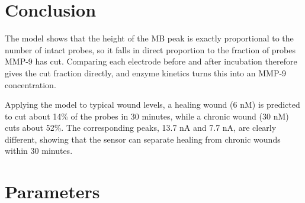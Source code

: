 \documentclass[10pt,a4paper]{article}
\numberwithin{equation}{section}
\begin{document}
\section{Conclusion}

The model shows that the height of the MB peak is exactly proportional to the number of intact probes, so it falls in direct proportion to the fraction of probes MMP-9 has cut. Comparing each electrode before and after incubation therefore gives the cut fraction directly, and enzyme kinetics turns this into an MMP-9 concentration.

Applying the model to typical wound levels, a healing wound (6 nM) is predicted to cut about 14\% of the probes in 30 minutes, while a chronic wound (30 nM) cuts about 52\%. The corresponding peaks, 13.7 nA and 7.7 nA, are clearly different, showing that the sensor can separate healing from chronic wounds within 30 minutes.

\section*{Parameters}
\end{document}
